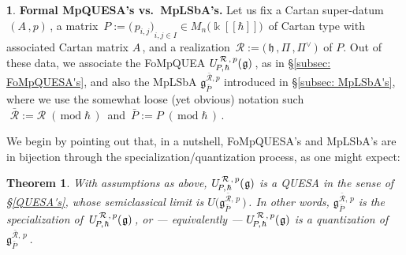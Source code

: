 \documentclass[12pt,reqno,twoside,a4paper]{amsart}
\numberwithin{equation}{section}
\newtheorem{theorem}[lema]{Theorem}
\theoremstyle{definition}
\newtheorem{free text}[lema]{}
\theoremstyle{remark}
\newcommand{\R}{{\mathcal R}}
\def \kh{{\Bbbk[[\hbar]]}}
\def \Ppicc {{\scriptscriptstyle P}}
\def \Rpicc {{\scriptscriptstyle \R}}
\def \lieg{\mathfrak{g}}
\def \lieh{\mathfrak{h}}
\def \uRpPhg{U^{\,\R\,,\,p}_{\!P,\hskip0,7pt\hbar}(\hskip0,5pt\lieg)}
\theoremstyle{plain}
\begin{document}
\begin{free text}
%
 {\bf Formal MpQUESA's vs.\ MpLSbA's.}
%
 Let us fix a Cartan super-datum  $ \, (A\,,p) \, $,  a matrix
 $ \, P := {\big(\, p_{i,j} \big)}_{i, j \in I} \in M_n\big( \kh \big) \, $
 of Cartan type with associated Cartan matrix  $ A \, $,
 and a realization  $ \, \R := \big(\, \lieh \, , \Pi \, , \Pi^\vee \,\big) \, $  of  $ P $.
 Out of these data, we associate the FoMpQUEA  $ \uRpPhg \, $,
 as in  \S \ref{subsec: FoMpQUESA's},  and also the MpLSbA
 $ \lieg^{{\bar{\Rpicc}},p}_{\bar{\Ppicc}} $  introduced in
 \S \ref{subsec: MpLSbA's},  where
%
%
 we use the somewhat loose (yet obvious) notation such
 $ \, \, \bar{\R} := \R \; (\,\text{mod} \; \hbar \,) \, $  and
 $ \, \bar{P} := P \; (\,\text{mod} \; \hbar \,) \, $.

\vskip5pt

   We begin by pointing out that, in a nutshell, FoMpQUESA's and
   MpLSbA's are in bijection through the specialization/quantization process,
   as one might expect:
%
%
\end{free text}

\vskip9pt

\begin{theorem}  \label{thm: semicl-limit FoMpQUESA}
%
 With assumptions as above,  $ \uRpPhg $  is a  \textsl{QUESA}
 in the sense of  \S \ref{QUESA's},  whose semiclassical limit is
 $ U\big(\lieg^{{\bar{\Rpicc}},\,p}_{\bar{\Ppicc}}\,\big) \, $.
 In other words,  \textsl{$ \lieg^{{\bar{\Rpicc}},\,p}_{\bar{\Ppicc}} $
 is the specialization of  $ \, \uRpPhg \, $,  or   --- equivalently ---
 $ \uRpPhg $  is a quantization of  $ \lieg^{{\bar{\Rpicc}},\,p}_{\bar{\Ppicc}} \, $}.
%
\end{theorem}
\end{document}
